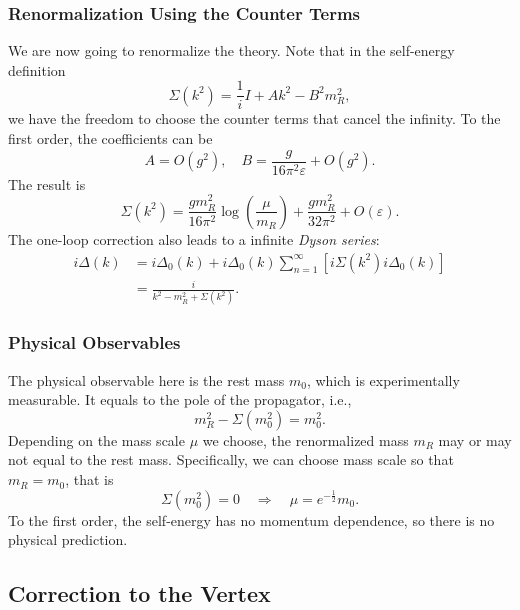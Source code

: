 \subsubsection{Renormalization Using the Counter Terms}
We are now going to renormalize the theory.
Note that in the self-energy definition
\begin{equation}
	\Sigma(k^2) = \frac{1}{i} I + A k^2-B^2 m_R^2,
\end{equation}
we have the freedom to choose the counter terms that cancel the infinity.
To the first order, the coefficients can be
\begin{equation}
	A = O(g^2), \quad
	B = \frac{g}{16\pi^2 \varepsilon} + O(g^2).
\end{equation}
The result is
\begin{equation}
	\Sigma(k^2) = \frac{g m_R^2}{16\pi^2} \log \left(\frac{\mu}{m_R}\right)
	+\frac{g m_R^2}{32\pi^2}+O(\varepsilon).
\end{equation}
The one-loop correction also leads to a infinite \textit{Dyson series}:
\begin{equation}
\begin{aligned}
	i\Delta(k) &= i\Delta_0(k) + i\Delta_0(k)\sum_{n=1}^\infty \left[i\Sigma(k^2)i\Delta_0(k)\right] \\
	&= \frac{i}{k^2 -m_R^2 + \Sigma(k^2)}.
\end{aligned}
\end{equation}



\subsubsection{Physical Observables}
The physical observable here is the rest mass $m_0$, which is experimentally measurable.
It equals to the pole of the propagator, i.e.,
\begin{equation}
	m_R^2 - \Sigma(m_0^2) = m_0^2.
\end{equation}
Depending on the mass scale $\mu$ we choose, the renormalized mass $m_R$ may or may not equal to the rest mass.
Specifically, we can choose mass scale so that $m_R = m_0$, that is
\begin{equation}
	\Sigma(m_0^2) = 0 \quad \Longrightarrow \quad
	\mu = e^{-\frac{1}{2}} m_0.
\end{equation}
To the first order, the self-energy has no momentum dependence, so there is no physical prediction.




\subsection{Correction to the Vertex}


